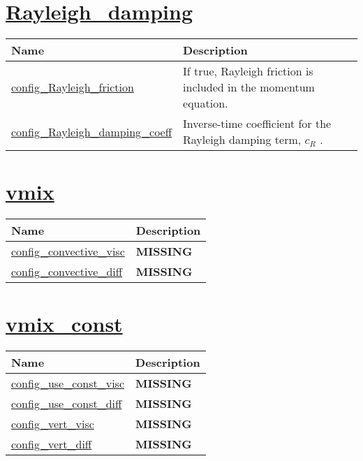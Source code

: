 \section[Rayleigh\_damping]{\hyperref[sec:nm_sec_Rayleigh_damping]{Rayleigh\_damping}}
\label{sec:nm_tab_Rayleigh_damping}

{\small
\begin{center}
\begin{longtable}{| p{2.0in} || p{4.0in} |}
	\hline
	{\bf Name} & {\bf Description} \\
	\hline
	\hline
	\hyperref[subsec:nm_sec_config_Rayleigh_friction]{config\_Rayleigh\_friction} & If true, Rayleigh friction is included in the momentum equation. \\
	\hline
	\hyperref[subsec:nm_sec_config_Rayleigh_damping_coeff]{config\_Rayleigh\_damping\_coeff} &  Inverse-time coefficient for the Rayleigh damping term,  $c_R$ . \\
	\hline
\end{longtable}
\end{center}
}
\section[vmix]{\hyperref[sec:nm_sec_vmix]{vmix}}
\label{sec:nm_tab_vmix}
{\small
\begin{center}
\begin{longtable}{| p{2.0in} || p{4.0in} |}
	\hline
	{\bf Name} & {\bf Description} \\
	\hline
	\hline
	\hyperref[subsec:nm_sec_config_convective_visc]{config\_convective\_visc} & {\bf \color{red} MISSING} \\
	\hline
	\hyperref[subsec:nm_sec_config_convective_diff]{config\_convective\_diff} & {\bf \color{red} MISSING} \\
	\hline
\end{longtable}
\end{center}
}
\section[vmix\_const]{\hyperref[sec:nm_sec_vmix_const]{vmix\_const}}
\label{sec:nm_tab_vmix_const}
{\small
\begin{center}
\begin{longtable}{| p{2.0in} || p{4.0in} |}
	\hline
	{\bf Name} & {\bf Description} \\
	\hline
	\hline
	\hyperref[subsec:nm_sec_config_use_const_visc]{config\_use\_const\_visc} & {\bf \color{red} MISSING} \\
	\hline
	\hyperref[subsec:nm_sec_config_use_const_diff]{config\_use\_const\_diff} & {\bf \color{red} MISSING} \\
	\hline
	\hyperref[subsec:nm_sec_config_vert_visc]{config\_vert\_visc} & {\bf \color{red} MISSING} \\
	\hline
	\hyperref[subsec:nm_sec_config_vert_diff]{config\_vert\_diff} & {\bf \color{red} MISSING} \\
	\hline
\end{longtable}
\end{center}
}
